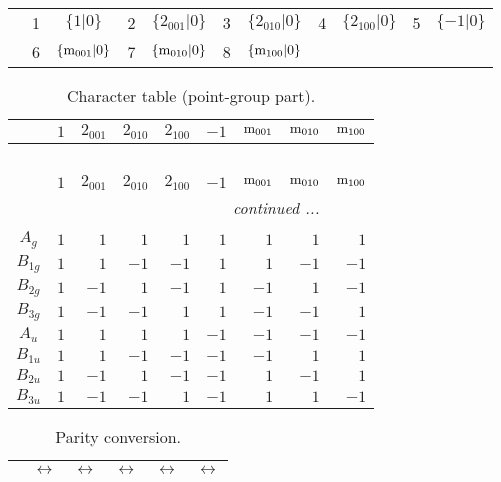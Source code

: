 \documentclass[fleqn,10pt,landscape]{article}
\begin{document}
\begin{itemize}
\begin{center}
\begin{longtable}{c|cc|cc|cc|cc|cc}
 & 1 & $\{1|0\}$ & 2 & $\{2{}_{001}|0\}$ & 3 & $\{2{}_{010}|0\}$ & 4 & $\{2{}_{100}|0\}$ & 5 & $\{-1|0\}$ \\
& 6 & $\{{\rm m}_{001}|0\}$ & 7 & $\{{\rm m}_{010}|0\}$ & 8 & $\{{\rm m}_{100}|0\}$ &  &  &  &  \\
\end{longtable}
\end{center}
\begin{center}
\renewcommand{\arraystretch}{1.0}
\begin{longtable}{c|rrrrrrrr}
\caption{Character table (point-group part).}
 \\
 \hline \hline
 & $ 1 $ & $ 2{}_{001} $ & $ 2{}_{010} $ & $ 2{}_{100} $ & $ -1 $ & $ {\rm m}_{001} $ & $ {\rm m}_{010} $ & $ {\rm m}_{100} $ \\ \hline \endfirsthead

\multicolumn{8}{l}{\tablename\ \thetable{}} \\
 \hline \hline
 & $ 1 $ & $ 2{}_{001} $ & $ 2{}_{010} $ & $ 2{}_{100} $ & $ -1 $ & $ {\rm m}_{001} $ & $ {\rm m}_{010} $ & $ {\rm m}_{100} $ \\ \hline \endhead

 \hline \hline
\multicolumn{8}{r}{\footnotesize\it continued ...} \\ \endfoot

 \hline \hline
\multicolumn{8}{r}{} \\ \endlastfoot

$ A_{g} $ & $ 1 $ & $ 1 $ & $ 1 $ & $ 1 $ & $ 1 $ & $ 1 $ & $ 1 $ & $ 1 $ \\
$ B_{1g} $ & $ 1 $ & $ 1 $ & $ -1 $ & $ -1 $ & $ 1 $ & $ 1 $ & $ -1 $ & $ -1 $ \\
$ B_{2g} $ & $ 1 $ & $ -1 $ & $ 1 $ & $ -1 $ & $ 1 $ & $ -1 $ & $ 1 $ & $ -1 $ \\
$ B_{3g} $ & $ 1 $ & $ -1 $ & $ -1 $ & $ 1 $ & $ 1 $ & $ -1 $ & $ -1 $ & $ 1 $ \\
$ A_{u} $ & $ 1 $ & $ 1 $ & $ 1 $ & $ 1 $ & $ -1 $ & $ -1 $ & $ -1 $ & $ -1 $ \\
$ B_{1u} $ & $ 1 $ & $ 1 $ & $ -1 $ & $ -1 $ & $ -1 $ & $ -1 $ & $ 1 $ & $ 1 $ \\
$ B_{2u} $ & $ 1 $ & $ -1 $ & $ 1 $ & $ -1 $ & $ -1 $ & $ 1 $ & $ -1 $ & $ 1 $ \\
$ B_{3u} $ & $ 1 $ & $ -1 $ & $ -1 $ & $ 1 $ & $ -1 $ & $ 1 $ & $ 1 $ & $ -1 $ \\
\end{longtable}
\end{center}
\begin{center}
\renewcommand{\arraystretch}{1.0}
\begin{longtable}{cccccc}
\caption{Parity conversion.}
 \\
 \hline \hline
 & $\leftrightarrow$ & $\leftrightarrow$ & $\leftrightarrow$ & $\leftrightarrow$ & $\leftrightarrow$ \\ \hline \endfirsthead


\end{longtable}
\end{center}
\end{itemize}
\end{document}
